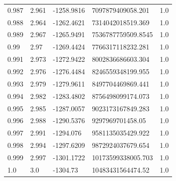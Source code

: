 \begin{tabular}{lllll}
0.987 & 2.961 & -1258.9816 & 7097879409058.201 & 1.0 \\
0.988 & 2.964 & -1262.4621 & 7314042018519.369 & 1.0 \\
0.989 & 2.967 & -1265.9491 & 7536787759509.8545 & 1.0 \\
0.99 & 2.97 & -1269.4424 & 7766317118232.281 & 1.0 \\
0.991 & 2.973 & -1272.9422 & 8002836686603.304 & 1.0 \\
0.992 & 2.976 & -1276.4484 & 8246559348199.955 & 1.0 \\
0.993 & 2.979 & -1279.9611 & 8497704469869.441 & 1.0 \\
0.994 & 2.982 & -1283.4802 & 8756498099174.073 & 1.0 \\
0.995 & 2.985 & -1287.0057 & 9023173167849.283 & 1.0 \\
0.996 & 2.988 & -1290.5376 & 9297969701458.05 & 1.0 \\
0.997 & 2.991 & -1294.076 & 9581135035429.922 & 1.0 \\
0.998 & 2.994 & -1297.6209 & 9872924037679.654 & 1.0 \\
0.999 & 2.997 & -1301.1722 & 10173599338005.703 & 1.0 \\
1.0 & 3.0 & -1304.73 & 10483431564474.52 & 1.0 \\
\bottomrule
\end{tabular}
